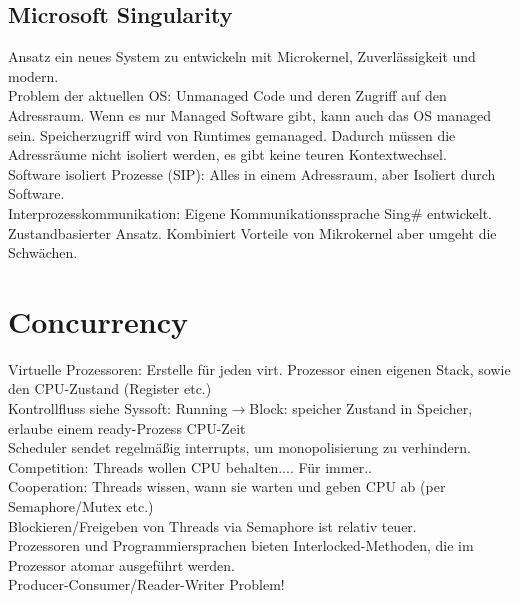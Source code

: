 \documentclass[a4paper]{article}
\begin{document}
\subsection{Microsoft Singularity}
Ansatz ein neues System zu entwickeln mit Microkernel, Zuverlässigkeit und modern.\\
Problem der aktuellen OS: Unmanaged Code und deren Zugriff auf den Adressraum. Wenn es nur Managed Software gibt, kann auch das OS managed sein. Speicherzugriff wird von Runtimes gemanaged. Dadurch müssen die Adressräume nicht isoliert werden, es gibt keine teuren Kontextwechsel.\\
Software isoliert Prozesse (SIP): Alles in einem Adressraum, aber Isoliert durch Software.\\
Interprozesskommunikation: Eigene Kommunikationssprache Sing\# entwickelt. Zustandbasierter Ansatz.
Kombiniert Vorteile von Mikrokernel aber umgeht die Schwächen.\\
\section{Concurrency}
Virtuelle Prozessoren: Erstelle für jeden virt. Prozessor einen eigenen Stack, sowie den CPU-Zustand (Register etc.)\\
Kontrollfluss siehe Syssoft: Running$\rightarrow$Block: speicher Zustand in Speicher, erlaube einem ready-Prozess CPU-Zeit\\
Scheduler sendet regelmäßig interrupts, um monopolisierung zu verhindern.\\
Competition: Threads wollen CPU behalten.... Für immer..\\
Cooperation: Threads wissen, wann sie warten und geben CPU ab (per Semaphore/Mutex etc.)\\
Blockieren/Freigeben von Threads via Semaphore ist relativ teuer.\\
Prozessoren und Programmiersprachen bieten Interlocked-Methoden, die im Prozessor atomar ausgeführt werden.\\
Producer-Consumer/Reader-Writer Problem!\\
\end{document}

